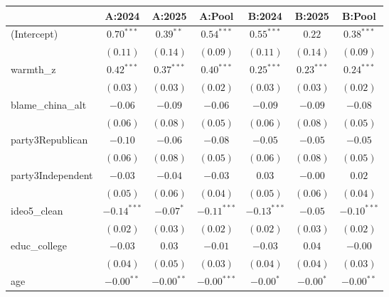 \begin{tabular}{l c c c c c c}
\toprule
 & A:2024 & A:2025 & A:Pool & B:2024 & B:2025 & B:Pool \\
\midrule
(Intercept)                 & $0.70^{***}$  & $0.39^{**}$  & $0.54^{***}$  & $0.55^{***}$  & $0.22$       & $0.38^{***}$  \\
                            & $(0.11)$      & $(0.14)$     & $(0.09)$      & $(0.11)$      & $(0.14)$     & $(0.09)$      \\
warmth\_z                   & $0.42^{***}$  & $0.37^{***}$ & $0.40^{***}$  & $0.25^{***}$  & $0.23^{***}$ & $0.24^{***}$  \\
                            & $(0.03)$      & $(0.03)$     & $(0.02)$      & $(0.03)$      & $(0.03)$     & $(0.02)$      \\
blame\_china\_alt           & $-0.06$       & $-0.09$      & $-0.06$       & $-0.09$       & $-0.09$      & $-0.08$       \\
                            & $(0.06)$      & $(0.08)$     & $(0.05)$      & $(0.06)$      & $(0.08)$     & $(0.05)$      \\
party3Republican            & $-0.10$       & $-0.06$      & $-0.08$       & $-0.05$       & $-0.05$      & $-0.05$       \\
                            & $(0.06)$      & $(0.08)$     & $(0.05)$      & $(0.06)$      & $(0.08)$     & $(0.05)$      \\
party3Independent           & $-0.03$       & $-0.04$      & $-0.03$       & $0.03$        & $-0.00$      & $0.02$        \\
                            & $(0.05)$      & $(0.06)$     & $(0.04)$      & $(0.05)$      & $(0.06)$     & $(0.04)$      \\
ideo5\_clean                & $-0.14^{***}$ & $-0.07^{*}$  & $-0.11^{***}$ & $-0.13^{***}$ & $-0.05$      & $-0.10^{***}$ \\
                            & $(0.02)$      & $(0.03)$     & $(0.02)$      & $(0.02)$      & $(0.03)$     & $(0.02)$      \\
educ\_college               & $-0.03$       & $0.03$       & $-0.01$       & $-0.03$       & $0.04$       & $-0.00$       \\
                            & $(0.04)$      & $(0.05)$     & $(0.03)$      & $(0.04)$      & $(0.04)$     & $(0.03)$      \\
age                         & $-0.00^{**}$  & $-0.00^{**}$ & $-0.00^{***}$ & $-0.00^{*}$   & $-0.00^{*}$  & $-0.00^{**}$  \\

\end{tabular}
